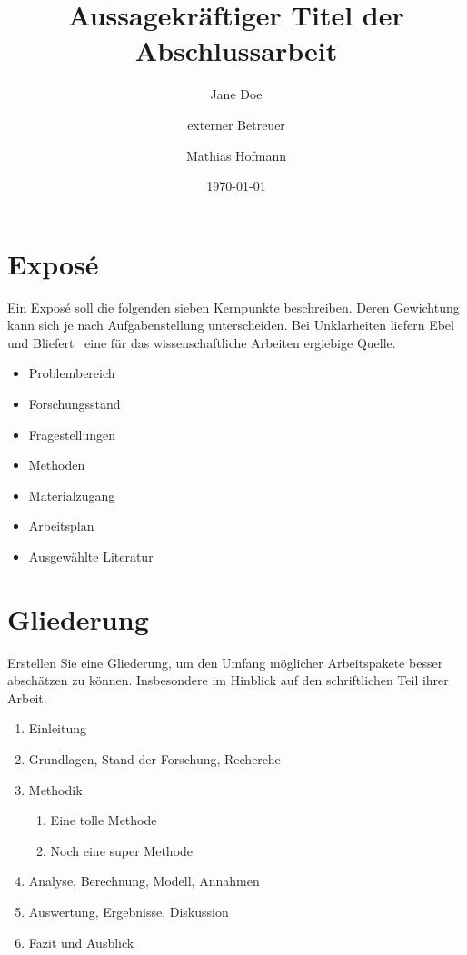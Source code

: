 

\subject{Exposé zur Abschlussarbeit}
\title{Aussagekräftiger Titel der Abschlussarbeit}
\author[1,2]{Jane Doe}
\author[2]{externer Betreuer}
\author[1]{Mathias Hofmann}
\date{\today}



\maketitle

\section*{Exposé}

Ein Exposé soll die folgenden sieben Kernpunkte beschreiben. Deren Gewichtung kann sich je nach Aufgabenstellung unterscheiden. Bei Unklarheiten liefern Ebel und Bliefert~\cite{ebel2009} eine für das wissenschaftliche Arbeiten ergiebige Quelle.

\begin{itemize}
    \item Problembereich
    \item Forschungsstand
    \item Fragestellungen
    \item Methoden
    \item Materialzugang
    \item Arbeitsplan
    \item Ausgewählte Literatur
\end{itemize}

\section*{Gliederung}

Erstellen Sie eine Gliederung, um den Umfang möglicher Arbeitspakete besser abschätzen zu können. Insbesondere im Hinblick auf den schriftlichen Teil ihrer Arbeit.

\begin{enumerate}
    \item Einleitung
    \item Grundlagen, Stand der Forschung, Recherche
    \item Methodik
        \begin{enumerate}
            \item Eine tolle Methode
            \item Noch eine super Methode
        \end{enumerate}
    \item Analyse, Berechnung, Modell, Annahmen
    \item Auswertung, Ergebnisse, Diskussion
    \item Fazit und Ausblick
\end{enumerate}

